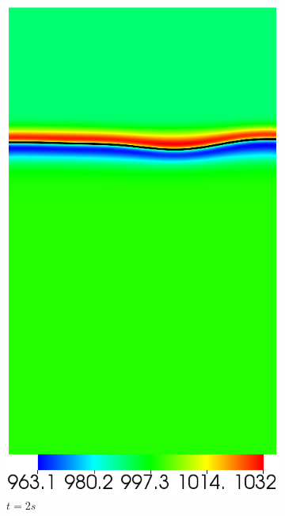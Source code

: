\begin{figure}[H]
\begin{subfigure}[ht!]{0.2\textwidth}
		\includegraphics[width=1\textwidth]{figure/PT_RT/masse_vol/visit0015.png}
		\caption{$t=2s$}
	\end{subfigure}
	\begin{subfigure}[ht!]{0.2\textwidth}
		\centering

\end{subfigure}
\end{figure}
